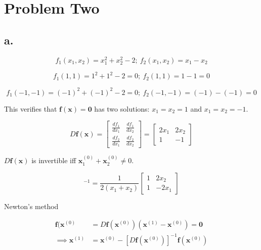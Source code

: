 \documentclass[00-main.tex]{subfiles}
\begin{document}
\section*{Problem Two}

\subsection*{a.}
\begin{equation}
f_1(x_1, x_2) = x_1^2 + x_2^2 - 2; \: f_2(x_1, x_2) = x_1 - x_2
\end{equation}

\begin{equation}
f_1(1, 1) = 1^2 + 1^2 - 2 = 0; \: f_2(1, 1) = 1 - 1 = 0
\end{equation}

\begin{equation}
f_1(-1, -1) = (-1)^2 + (-1)^2 - 2 = 0; \: f_2(-1, -1) = (-1) - (-1) = 0
\end{equation}

This verifies that $\mathbf{f}(\mathbf{x}) = \mathbf{0}$ has two solutions: $x_1 = x_2 = 1$ and $x_1 = x_2 = -1$.

\begin{equation}
D\mathbf{f}(\mathbf{x})
=
\left[ 	
	\begin{array}{cc} 
		\frac{df_1}{dx_1} & \frac{df_1}{dx_2} \\ 
		\frac{df_2}{dx_1} & \frac{df_2}{dx_2}  
	\end{array} 
\right]
=
\left[ 	
	\begin{array}{cc} 
		2x_1 & 2x_2 \\ 
		1    & -1  
	\end{array} 
\right] 
\end{equation}

$D\mathbf{f}(\mathbf{x})$ is invertible iff $\mathbf{x}_1^{(0)} + \mathbf{x}_2^{(0)} \neq 0$.

\begin{equation}
[D\mathbf{f}(\mathbf{x})]^{-1}
=
\frac{1}{2(x_1+x_2)} 
\left[ 	
	\begin{array}{cc} 
		1 & 2x_2 \\ 
		1 & -2x_1  
	\end{array} 
\right] 
\end{equation}

Newton's method

\begin{align}
\mathbf{f} (\mathbf{x}^{(0)} &= D \mathbf{f} (\mathbf{x}^{(0)})(\mathbf{x}^{(1)} - \mathbf{x}^{(0)}) = \mathbf{0} \\
\implies
\mathbf{x}^{(1)} &= \mathbf{x}^{(0)} - \left[D\mathbf{f}(\mathbf{x}^{(0)})\right]^{-1} \mathbf{f} (\mathbf{x}^{(0)})
\end{align}
\end{document}
